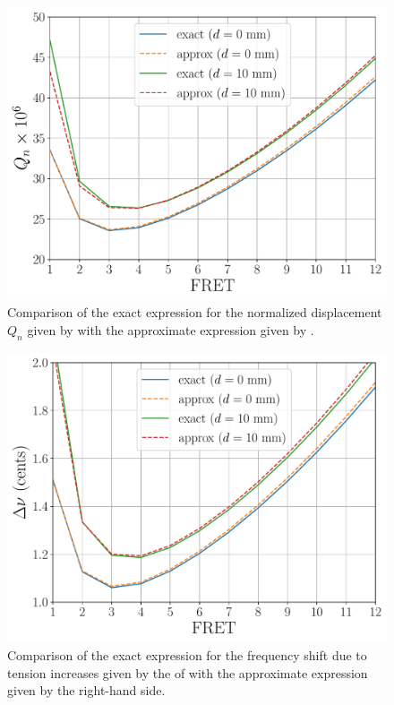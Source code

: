 

\begin{figure}
  \centering
  \includegraphics[width=5.0in]{figures/qn_test}
  \caption{\label{fig:qn_test} Comparison of the exact expression for the normalized displacement $Q_n$ given by  with the approximate expression given by .}
\end{figure}

\begin{figure}
  \centering
  \includegraphics[width=5.0in]{figures/tn_test}
  \caption{\label{fig:tn_test} Comparison of the exact expression for the frequency shift due to tension increases given by the \lhs of  with the approximate expression given by the right-hand side.}
\end{figure}

